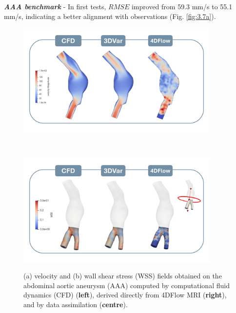 \textbf{\textit{AAA benchmark}} - In first tests, \(RMSE\) improved from 59.3 mm/s to 55.1 mm/s, indicating a better alignment with observations (Fig. \ref{fig:3.7a}). 
\begin{figure}
    \centering
    \begin{minipage}{\textwidth}
        \centering
        \includegraphics[width=0.9\textwidth]{chapters/paratico/Fig1.3a.pdf}
        \label{fig:3.7a}
    \end{minipage}
    \\[1em]  
    \begin{minipage}{\textwidth}
        \centering
        \includegraphics[width=0.9\textwidth]{chapters/paratico/Fig1.3b.pdf}
        \label{fig:3.7b}
    \end{minipage}
    \caption{\small (a) velocity and (b) wall shear stress (WSS) fields obtained on the abdominal aortic aneurysm (AAA) computed by computational fluid dynamics (CFD) (\textbf{left}), derived directly from 4DFlow MRI (\textbf{right}), and by  data assimilation (\textbf{centre}).}
    \label{fig:3.7}
\end{figure}

